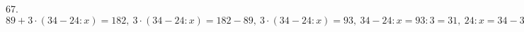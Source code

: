 67. $89+3\cdot(34-24:x)=182,\ 3\cdot(34-24:x)=182-89,\ 3\cdot(34-24:x)=93,\ 34-24:x=93:3=31,\ 24:x=34-31=3,\ x=24:3=8.$\\
